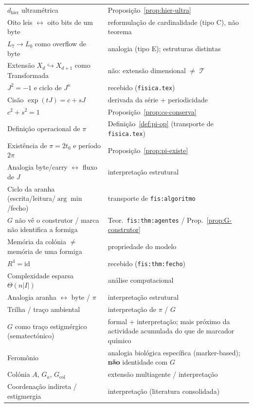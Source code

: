 \documentclass[11pt,a4paper]{article}
\begin{document}
\begin{center}
\begin{tabular}{@{}p{}p{}@{}}
\(d_{\mathrm{hier}}\) ultramétrica & Proposição~\ref{prop:hier-ultra} \\
Oito leis \(\leftrightarrow\) oito bits de um byte & reformulação de cardinalidade (tipo C), não teorema \\
\(L_7\to L_0\) como overflow de byte & analogia (tipo E); estruturas distintas \\
Extensão \(X_d\hookrightarrow X_{d+1}\) como Transformada & não: extensão dimensional \(\neq\) \(\mathcal T\) \\
\(J^2=-1\) e ciclo de \(J^n\) & recebido (\texttt{fisica.tex}) \\
Cisão \(\exp(tJ)=c+sJ\) & derivada da série + periodicidade \\
\(c^2+s^2=1\) & Proposição~\ref{prop:cs-conserva} \\
Definição operacional de \(\pi\) & Definição~\ref{def:pi-op} (transporte de \texttt{fisica.tex}) \\
Existência de \(\pi=2t_0\) e período \(2\pi\) & Proposição~\ref{prop:pi-existe} \\
Analogia byte/carry \(\leftrightarrow\) fluxo de \(J\) & interpretação estrutural \\
Ciclo da aranha (escrita/leitura/\(\arg\min\)/fecho) & transporte de \texttt{fis:algoritmo} \\
\(G\) não vê o construtor / marca não identifica a formiga & Teor.\ \texttt{fis:thm:agentes} / Prop.~\ref{prop:G-construtor} \\
Memória da colónia \(\neq\) memória de uma formiga & propriedade do modelo \\
\(R^4=\mathrm{id}\) & recebido (\texttt{fis:thm:fecho}) \\
Complexidade esparsa \(\Theta(n\lvert I\rvert)\) & análise computacional \\
Analogia aranha \(\leftrightarrow\) byte / \(\pi\) & interpretação estrutural \\
Trilha / traço ambiental & interpretação de \(\pi\) / \(G\) \\
\(G\) como traço estigmérgico (sematectónico) & formal + interpretação; mais próximo da actividade acumulada do que de marcador químico \\
Feromônio & analogia biológica específica (marker-based); \textbf{não} identidade com \(G\) \\
Colónia \(A\), \(G_a\), \(G_{\mathrm{col}}\) & extensão multiagente / interpretação \\
Coordenação indireta / estigmergia & interpretação (literatura consolidada) \\

\end{tabular}
\end{center}
\end{document}
